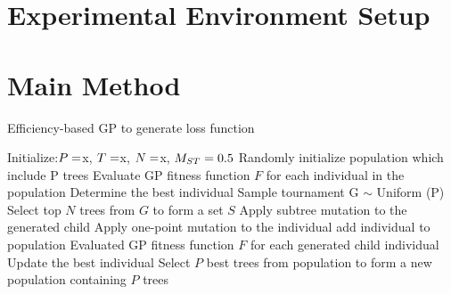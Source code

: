 \begin{ZhChapter}
\section{Experimental Environment Setup}

\section{Main Method}

\begin{algorithm}
\caption{Efficiency-based GP to generate loss function}\label{alg:cap}
\begin{algorithmic}
    \State Initialize:$P = \space $x, $T =\space $x, $N = \space $x, $M_{ST} = \space0.5$
    \State Randomly initialize population which include P trees
    \State Evaluate GP fitness function $F$ for each individual in the population
    \State Determine the best individual
        \State Sample tournament G $\sim$ Uniform (P)
        \State Select top $N$ trees from $G$ to form a set $S$
                \State Apply subtree mutation to the generated child
            \Else
                \State Apply one-point mutation to the individual
            \EndIf
                \State add individual to population
            \EndIf
        \EndFor
        \State Evaluated GP fitness function $F$ for each generated child individual
        \State Update the best individual
        \State Select $P$ best trees from population to form a new population containing $P$ trees
    \EndWhile
\end{algorithmic}
\end{algorithm}



\end{ZhChapter}
